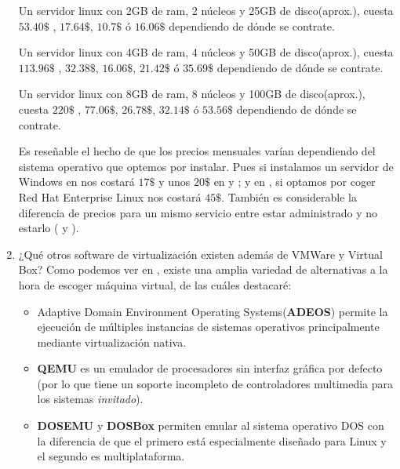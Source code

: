 \documentclass[paper=a4, fontsize=11pt]{scrartcl} %
\numberwithin{equation}{section} %
\numberwithin{figure}{section} %
\numberwithin{table}{section} %
\begin{document}
\begin{enumerate}
		Un servidor linux con 2GB de ram, 2 núcleos y 25GB de disco(aprox.), cuesta $53.40\$$
		\cite{VPS_IBM}, $17.64\$$\cite{VPS_Gigas}, $10.7\$$\cite{VPS_Axarnet} ó $16.06\$$
		\cite{VPS_Axarnet_admin} dependiendo de dónde se contrate.
		
		Un servidor linux con 4GB de ram, 4 núcleos y 50GB de disco(aprox.), cuesta $113.96\$$
		\cite{VPS_IBM}, $32.38\$$\cite{VPS_Gigas}, $16.06\$$\cite{VPS_Axarnet}, $21.42\$$
		\cite{VPS_Axarnet_admin} ó $35.69\$$\cite{VPS_Axarnet_admin_2} dependiendo de dónde se contrate.
		
		Un servidor linux con 8GB de ram, 8 núcleos y 100GB de disco(aprox.), cuesta $220\$$
		\cite{VPS_IBM}, $77.06\$$\cite{VPS_Gigas}, $26.78\$$\cite{VPS_Axarnet}, $32.14\$$
		\cite{VPS_Axarnet_admin} ó $53.56\$$\cite{VPS_Axarnet_admin_2} dependiendo de dónde se contrate.
		
		Es reseñable el hecho de que los precios mensuales varían dependiendo del sistema operativo
		que optemos por instalar. Pues si instalamos un servidor de Windows en \cite{VPS_IBM} nos
		costará $17\$$ y unos $20\$$ en \cite{VPS_Axarnet} y \cite{VPS_Axarnet_admin}; y en
		\cite{VPS_IBM}, si optamos por coger Red Hat Enterprise Linux nos costará $45\$$. También es
		considerable la diferencia de precios para un mismo servicio entre estar administrado y no
		estarlo (\cite{VPS_Axarnet} y \cite{VPS_Axarnet_admin}).
		
		\item ¿Qué otros software de virtualización existen además de VMWare y Virtual Box?
		Como podemos ver en \cite{VMSW}, existe una amplia variedad de alternativas a la hora de
		escoger máquina virtual, de las cuáles destacaré:
		
		\begin{itemize}
			\item Adaptive Domain Environment Operating Systems(\textbf{ADEOS}\cite{Adeos}) permite
			la ejecución de múltiples instancias de sistemas operativos principalmente mediante
			virtualización nativa.
			
			\item \textbf{QEMU}\cite{QEMU} es un emulador de procesadores sin interfaz gráfica por
			defecto (por lo que tiene un soporte incompleto de controladores multimedia para los
			sistemas \textit{invitado}).
			
			\item \textbf{DOSEMU}\cite{DOSEMU} y \textbf{DOSBox}\cite{DOSBox} permiten emular al
			sistema operativo DOS con la diferencia de que el primero está especialmente diseñado
			para Linux y el segundo es multiplataforma.
			

\end{itemize}
\end{enumerate}
\end{document}
